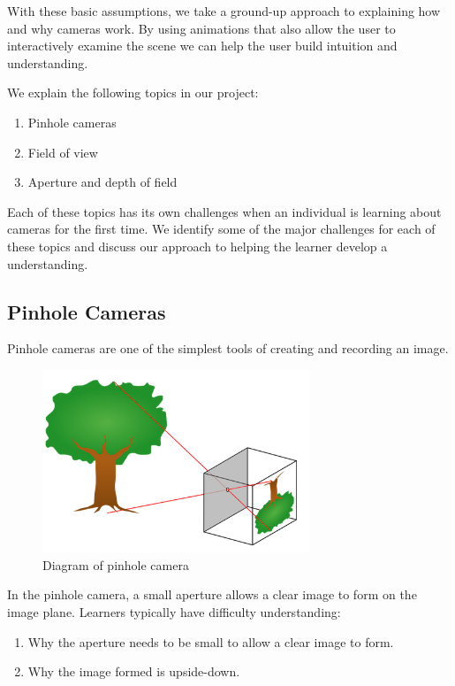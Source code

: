 \documentclass{acm_proc_article-sp}
\begin{document}
With these basic assumptions, we take a ground-up approach to explaining
how and why cameras work. By using animations that also allow the user to
interactively examine the scene we can help the user build intuition and
understanding.

We explain the following topics in our project:

\begin{enumerate}
  \item Pinhole cameras
  \item Field of view
  \item Aperture and depth of field
\end{enumerate}

Each of these topics has its own challenges when an individual is learning
about cameras for the first time. We identify some of the major challenges for
each of these topics and discuss our approach to helping the learner develop
a understanding.

\subsection{Pinhole Cameras}

Pinhole cameras are one of the simplest tools of creating and recording an
image.

\begin{figure}[h]
\caption{Diagram of pinhole camera \cite{pinhole}}
\includegraphics[width=8cm]{images/pinhole.png}
\end{figure}

In the pinhole camera, a small aperture allows a clear image to form on the
image plane. Learners typically have difficulty understanding:

\begin{enumerate}
  \item Why the aperture needs to be small to allow a clear image to form.
  \item Why the image formed is upside-down.
\end{enumerate}
\end{document}
